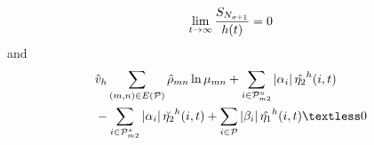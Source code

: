 \documentclass[twocolumn]{autart}    %
\begin{document}
\begin{thm}
\begin{equation}
    \begin{aligned}
        \setlength{\arraycolsep}{0.9pt}
        \lim_{t\rightarrow \infty}\frac{S_{N_{\sigma+1}}}{h(t)} = 0
    \end{aligned}
\end{equation}
and
\begin{equation}
    \begin{aligned}
        \setlength{\arraycolsep}{0.9pt}
        &\hat{v}_{h}\sum_{(m,n) \in E(\mathcal{P})}\hat{\rho}_{mn}\ln\mu_{mn}+\sum_{i \in \mathcal{P}_{m2}^{u}}\left|\alpha_{i}\right|\hat{\eta_{2}}^{h}(i,t)\\
        & -\sum_{i \in \mathcal{P}_{m2}^{s}}\left|\alpha_{i}\right|\breve{\eta_{2}}^{h}(i,t)+\sum_{i \in \mathcal{P}}\left|\beta_{i}\right|\hat{\eta_{1}}^{h}(i,t) \textless 0
    \end{aligned}
\end{equation}
\end{thm}
\end{document}
